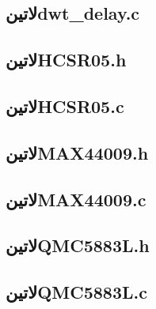 \subsection*{‌لاتین{dwt\_delay.c}}
\begin{latin}
	
\end{latin}

\subsection*{‌لاتین{HCSR05.h}}
\begin{latin}
	
\end{latin}

\subsection*{‌لاتین{HCSR05.c}}
\begin{latin}
	
\end{latin}

\subsection*{‌لاتین{MAX44009.h}}
\begin{latin}
	
\end{latin}

\subsection*{‌لاتین{MAX44009.c}}
\begin{latin}
	
\end{latin}

\subsection*{‌لاتین{QMC5883L.h}}
\begin{latin}
	
\end{latin}

\subsection*{‌لاتین{QMC5883L.c}}
\begin{latin}
	
\end{latin}

